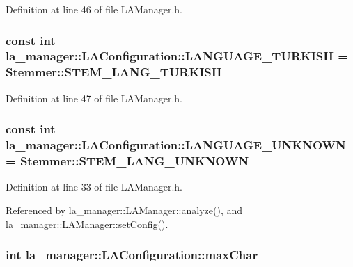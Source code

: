 Definition at line 46 of file LAManager.h.\hypertarget{classla__manager_1_1LAConfiguration_3584d8a2504d4aa80ed208aac9b64943}{
\subsubsection[{LANGUAGE\_\-TURKISH}]{\setlength{\rightskip}{0pt plus 5cm}const int {\bf la\_\-manager::LAConfiguration::LANGUAGE\_\-TURKISH} = Stemmer::STEM\_\-LANG\_\-TURKISH}}
\label{classla__manager_1_1LAConfiguration_3584d8a2504d4aa80ed208aac9b64943}




Definition at line 47 of file LAManager.h.\hypertarget{classla__manager_1_1LAConfiguration_a985c82a8f9c025137bded214ec9cd13}{
\subsubsection[{LANGUAGE\_\-UNKNOWN}]{\setlength{\rightskip}{0pt plus 5cm}const int {\bf la\_\-manager::LAConfiguration::LANGUAGE\_\-UNKNOWN} = Stemmer::STEM\_\-LANG\_\-UNKNOWN}}
\label{classla__manager_1_1LAConfiguration_a985c82a8f9c025137bded214ec9cd13}




Definition at line 33 of file LAManager.h.

Referenced by la\_\-manager::LAManager::analyze(), and la\_\-manager::LAManager::setConfig().\hypertarget{classla__manager_1_1LAConfiguration_fe9988d04c6006eb2ba27d8b74163eb1}{
\subsubsection[{maxChar}]{\setlength{\rightskip}{0pt plus 5cm}int {\bf la\_\-manager::LAConfiguration::maxChar}}}
\label{classla__manager_1_1LAConfiguration_fe9988d04c6006eb2ba27d8b74163eb1}


